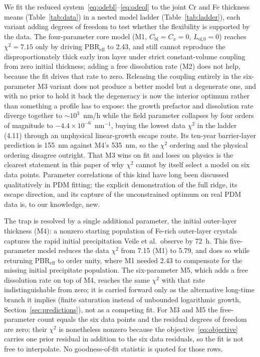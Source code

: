 \documentclass[pdflatex,sn-nature]{sn-jnl}
\begin{document}
We fit the reduced system~\eqref{eq:odebl}--\eqref{eq:odeol} to the
joint Cr and Fe thickness means (Table~\ref{tab:data}) in a nested model
ladder
(Table~\ref{tab:ladder}), each variant adding degrees of freedom to
test whether the flexibility is supported by the data. The
four-parameter core model (M1, $C_\text{bl}=C_x=0$,
$L_\text{ol,0}=0$) reaches $\chi^2 = 7.15$ only by driving
$\mathrm{PBR}_\text{eff}$ to 2.43, and still cannot reproduce the
disproportionately thick early iron layer under strict constant-volume
coupling from zero initial thickness; adding a free dissolution rate
(M2) does not help, because the fit drives that rate to zero. Releasing
the coupling entirely in the six-parameter M3 variant does not produce a
better model but a degenerate one, and with no prior to hold it back the
degeneracy is now the interior optimum rather than something a profile
has to expose: the growth prefactor and dissolution rate diverge
together to $\sim\!10^{3}$~nm/h while the field parameter
collapses by four orders of magnitude to
$-4.4\times10^{-6}$~nm$^{-1}$, buying the lowest data $\chi^2$ in the
ladder (4.11) through an unphysical linear-growth escape route. Its
ten-year barrier-layer prediction is 155~nm against M4's 535~nm, so the
$\chi^2$ ordering and the physical ordering disagree outright. That M3
wins on fit and loses on physics is the clearest statement in this paper
of why $\chi^2$ cannot by itself select a model on six data points.
Parameter correlations of this kind have long been discussed
qualitatively in PDM fitting; the explicit demonstration of the full
ridge, its escape direction, and its capture of the unconstrained
optimum on real PDM data is, to our knowledge, new.

The trap is resolved by a single additional parameter, the initial
outer-layer thickness (M4): a nonzero starting population of Fe-rich
outer-layer crystals captures the rapid initial precipitation Veile et
al.\ observe by 72~h. This five-parameter model reduces the data
$\chi^2$ from 7.15 (M1) to 5.79, and does so while returning
$\mathrm{PBR}_\text{eff}$ to order unity, where M1 needed 2.43 to
compensate for the missing initial precipitate population. The six-parameter M5, which adds a
free dissolution rate on top of M4, reaches the same $\chi^2$ with that
rate indistinguishable from zero; it is carried forward only as the
alternative long-time branch it implies (finite saturation instead of
unbounded logarithmic growth, Section~\ref{sec:predictions}), not as a
competing fit. For M3 and M5 the free-parameter count equals the six
data points and the residual degrees of freedom are zero; their $\chi^2$
is nonetheless nonzero because the objective~\eqref{eq:objective} carries
one prior residual in addition to the six data residuals, so the fit is
not free to interpolate. No goodness-of-fit statistic is quoted for those
rows.
\end{document}
